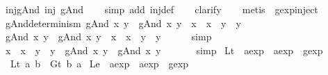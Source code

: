 \begin{isabellebody}
\isanewline
{}\isamarkupfalse%
\ inj{\isacharunderscore}gAnd{\isacharcolon}\ {\isachardoublequoteopen}inj\ gAnd{\isachardoublequoteclose}\isanewline
%
\isadelimproof
\ \ %
\endisadelimproof
%
\isatagproof
{}\isamarkupfalse%
\ {\isacharparenleft}simp\ add{\isacharcolon}\ inj{\isacharunderscore}def{\isacharparenright}\isanewline
\ \ \isamarkupfalse%
\ clarify\isanewline
\ \ \isamarkupfalse%
\ {\isacharparenleft}metis\ \ gexp{\isachardot}inject{\isacharparenleft}{}{\isacharparenright}{\isacharparenright}%
\endisatagproof
{\isafoldproof}%
%
\isadelimproof
\isanewline
%
\endisadelimproof
\isanewline
{}\isamarkupfalse%
\ gAnd{\isacharunderscore}determinism{\isacharcolon}\ {\isachardoublequoteopen}{\isacharparenleft}gAnd\ x\ y\ {\isacharequal}\ gAnd\ x{\isacharprime}\ y{\isacharprime}{\isacharparenright}\ {\isacharequal}\ {\isacharparenleft}x\ {\isacharequal}\ x{\isacharprime}\ {\isasymand}\ y\ {\isacharequal}\ y{\isacharprime}{\isacharparenright}{\isachardoublequoteclose}\isanewline
%
\isadelimproof
%
\endisadelimproof
%
\isatagproof
{}\isamarkupfalse%
\isanewline
\ \ \isamarkupfalse%
\ {\isachardoublequoteopen}gAnd\ x\ y\ {\isacharequal}\ gAnd\ x{\isacharprime}\ y{\isacharprime}\ {\isasymLongrightarrow}\ x\ {\isacharequal}\ x{\isacharprime}\ {\isasymand}\ y\ {\isacharequal}\ y{\isacharprime}{\isachardoublequoteclose}\isanewline
\ \ \ \ \isamarkupfalse%
\ {\isacharparenleft}simp{\isacharparenright}\isanewline
{}\isamarkupfalse%
\isanewline
\ \ \isamarkupfalse%
\ {\isachardoublequoteopen}x\ {\isacharequal}\ x{\isacharprime}\ {\isasymand}\ y\ {\isacharequal}\ y{\isacharprime}\ {\isasymLongrightarrow}\ gAnd\ x\ y\ {\isacharequal}\ gAnd\ x{\isacharprime}\ y{\isacharprime}\ {\isachardoublequoteclose}\isanewline
\ \ \ \ \isamarkupfalse%
\ simp\isanewline
{}\isamarkupfalse%
%
\endisatagproof
{\isafoldproof}%
%
\isadelimproof
\isanewline
%
\endisadelimproof
\isanewline
{}\isamarkupfalse%
\ Lt\ {\isacharcolon}{\isacharcolon}\ {\isachardoublequoteopen}aexp\ {\isasymRightarrow}\ aexp\ {\isasymRightarrow}\ gexp{\isachardoublequoteclose}\ \ \isanewline
\ \ {\isachardoublequoteopen}Lt\ a\ b\ {\isasymequiv}\ Gt\ b\ a{\isachardoublequoteclose}\isanewline
\isanewline
{}\isamarkupfalse%
\ Le\ {\isacharcolon}{\isacharcolon}\ {\isachardoublequoteopen}aexp\ {\isasymRightarrow}\ aexp\ {\isasymRightarrow}\ gexp{\isachardoublequoteclose}\ \ \isanewline

\end{isabellebody}
